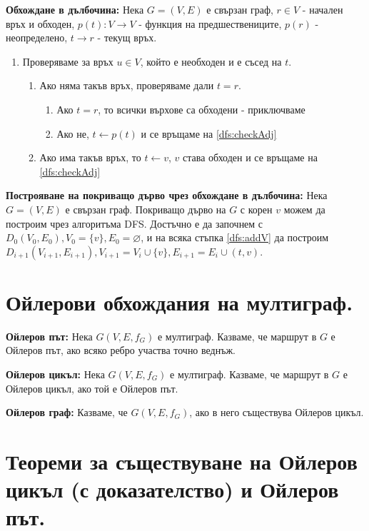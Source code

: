 \documentclass[fleqn,12pt]{article}
\begin{document}
\begin{flushleft}
\textbf{Обхождане в дълбочина: } Нека $G = (V, E)$ е свързан граф, $r \in V$ - начален връх и обходен, 
$p(t) : V \rightarrow V$ - функция на предшествениците, $p(r)$ - неопределено, $t \rightarrow r$ - текущ връх.
\begin{enumerate}
	\item \label{dfs:checkAdj} Проверяваме за връх $u \in V$, който е необходен и е съсед на $t$.
	\begin{enumerate}
		\item Ако няма такъв връх, проверяваме дали $t = r$.
		\begin{enumerate}
			\item Ако $t = r$, то всички върхове са обходени - приключваме
			\item Ако не, $t \leftarrow p(t)$ и се връщаме на \ref{dfs:checkAdj}
		\end{enumerate}
		\item \label{dfs:addV} Ако има такъв връх, то $t \leftarrow v$, $v$ става обходен и се връщаме на \ref{dfs:checkAdj}
	\end{enumerate}
\end{enumerate} 

\textbf{Построяване на покриващо дърво чрез обхождане в дълбочина: } Нека $G = (V, E)$ е свързан граф.
Покриващо дърво на $G$ с корен $v$ можем да построим чрез алгоритъма DFS. Достъчно е да започнем
с $D_0(V_0, E_0), V_0 = \{v\}, E_0 = \varnothing$, и на всяка стъпка \ref{dfs:addV} да построим
$D_{i + 1}(V_{i + 1}, E_{i + 1}), V_{i + 1} = V_i \cup \{ v \}, E_{i + 1} = E_i \cup (t, v)$.

\section{Ойлерови обхождания на мултиграф.}

\textbf{Ойлеров път: } Нека $G(V,E,f_G)$ е мултиграф. Казваме, че маршрут в $G$ е Ойлеров път, ако всяко ребро
участва точно веднъж.
\vspace{10mm}

\textbf{Ойлеров цикъл: } Нека $G(V,E,f_G)$ е мултиграф. Казваме, че маршрут в $G$ е Ойлеров цикъл, ако той е Ойлеров път.
\vspace{10mm}

\textbf{Ойлеров граф: } Казваме, че $G(V,E,f_G)$, ако в него съществува Ойлеров цикъл.

\section{Теореми за съществуване на Ойлеров цикъл (с доказателство) и Ойлеров път.}


\end{flushleft}
\end{document}
